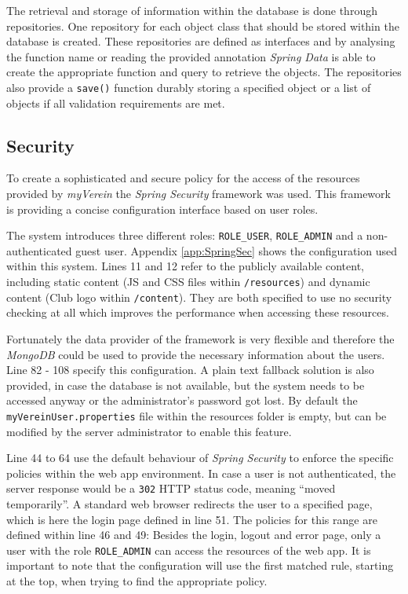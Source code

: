 The retrieval and storage of information within the database is done through repositories. One repository for each object class that should be stored within the database is created. These repositories are defined as interfaces and by analysing the function name or reading the provided annotation \emph{Spring Data} is able to create the appropriate function and query to retrieve the objects. The repositories also provide a \texttt{save()} function durably storing a specified object or a list of objects if all validation requirements are met. 

\subsection{Security}
\label{sec:ImplementationSec}

To create a sophisticated and secure policy for the access of the resources provided by \emph{myVerein} the \emph{Spring Security} framework was used. This framework is providing a concise configuration interface based on user roles.

The system introduces three different roles: \texttt{ROLE\_USER}, \texttt{ROLE\_ADMIN} and a non-authenticated guest user. Appendix \vref{app:SpringSec} shows the configuration used within this system. Lines 11 and 12 refer to the publicly available content, including static content (\gls{JS} and \gls{CSS} files within \texttt{/resources}) and dynamic content (Club logo within \texttt{/content}). They are both specified to use no security checking at all which improves the performance when accessing these resources.

Fortunately the data provider of the framework is very flexible and therefore the \emph{MongoDB} could be used to provide the necessary information about the users. Line 82 - 108 specify this configuration. A plain text fallback solution is also provided, in case the database is not available, but the system needs to be accessed anyway or the administrator's password got lost. By default the \texttt{myVereinUser.properties} file within the resources folder is empty, but can be modified by the server administrator to enable this feature.

Line 44 to 64 use the default behaviour of \emph{Spring Security} to enforce the specific policies within the web app environment. In case a user is not authenticated, the server response would be a \texttt{302} HTTP status code, meaning \enquote{moved temporarily}. A standard web browser redirects the user to a specified page, which is here the login page defined in line 51. The policies for this range are defined within line 46 and 49: Besides the login, logout and error page, only a user with the role \texttt{ROLE\_ADMIN} can access the resources of the web app. It is important to note that the configuration will use the first matched rule, starting at the top, when trying to find the appropriate policy.

